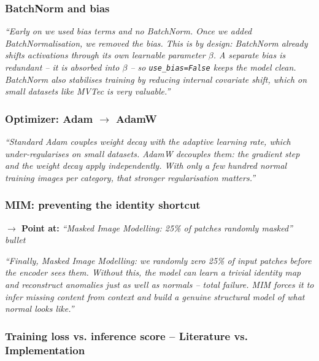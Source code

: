\documentclass[12pt, a4paper]{article}
\newcommand{\say}[1]{%
  \begin{mdframed}[style=saybox]
  \itshape ``#1''
  \end{mdframed}
}
\newcommand{\pointer}[1]{\noindent\textbf{\color{teal}$\rightarrow$ Point at:} \textit{#1}\\[2pt]}
\begin{document}
\subsubsection{BatchNorm and bias}

\say{Early on we used bias terms and no BatchNorm. Once we added BatchNormalisation, we removed the bias. This is by design: BatchNorm already shifts activations through its own learnable parameter $\beta$. A separate bias is redundant -- it is absorbed into $\beta$ -- so \texttt{use\_bias=False} keeps the model clean. BatchNorm also stabilises training by reducing internal covariate shift, which on small datasets like MVTec is very valuable.}

\subsubsection{Optimizer: Adam $\to$ AdamW}

\say{Standard Adam couples weight decay with the adaptive learning rate, which under-regularises on small datasets. AdamW decouples them: the gradient step and the weight decay apply independently. With only a few hundred normal training images per category, that stronger regularisation matters.}

\subsubsection{MIM: preventing the identity shortcut}

\pointer{``Masked Image Modelling: 25\% of patches randomly masked'' bullet}

\say{Finally, Masked Image Modelling: we randomly zero 25\% of input patches before the encoder sees them. Without this, the model can learn a trivial identity map and reconstruct anomalies just as well as normals -- total failure. MIM forces it to infer missing content from context and build a genuine structural model of what normal looks like.}

\subsubsection{Training loss vs. inference score -- Literature vs. Implementation}
\end{document}
